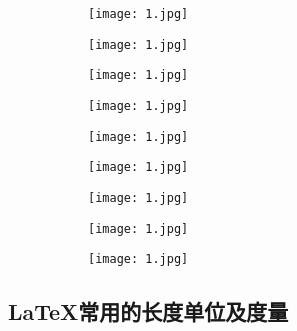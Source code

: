\begin{figure}[!htb]
\begin{subfigure}{.3\textwidth}
  \centering
  \label{fig:3a}
  \texttt{[image: 1.jpg]}
\end{subfigure}
\hfil
\begin{subfigure}{.3\textwidth}
  \centering
  \label{fig:3b}
  \texttt{[image: 1.jpg]}
\end{subfigure}
\hfil
\begin{subfigure}{.3\textwidth}
  \centering
  \label{fig:3c}
  \texttt{[image: 1.jpg]}
\end{subfigure}
\vspace{3mm}
\newline   %
\begin{subfigure}{.3\textwidth}
  \centering
  \label{fig:3d}
  \texttt{[image: 1.jpg]}
\end{subfigure}
\hfil
\begin{subfigure}{.3\textwidth}
  \centering
  \label{fig:3e}
  \texttt{[image: 1.jpg]}
\end{subfigure}
\hfil
\begin{subfigure}{.3\textwidth}
  \centering
  \label{fig:3f}
  \texttt{[image: 1.jpg]}
\end{subfigure}
\vspace{3mm}
\newline   %
\begin{subfigure}{.3\textwidth}
  \centering
  \label{fig:3g}
  \texttt{[image: 1.jpg]}
\end{subfigure}
\hfil
\begin{subfigure}{.3\textwidth}
  \centering
  \label{fig:3h}
  \texttt{[image: 1.jpg]}
\end{subfigure}
\hfil
\begin{subfigure}{.3\textwidth}
  \centering
  \label{fig:3i}
  \texttt{[image: 1.jpg]}
\end{subfigure}
\label{fig:3}
\end{figure}

\subsection{\LaTeX 常用的长度单位及度量}

